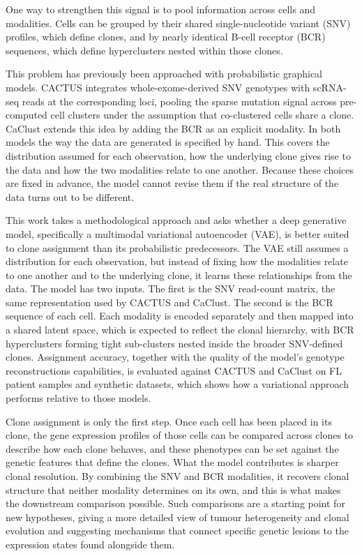 One way to strengthen this signal is to pool information across cells and modalities.
Cells can be grouped by their shared single-nucleotide variant (SNV) profiles, which define clones, and by nearly identical B-cell receptor (BCR) sequences, which define hyperclusters nested within those clones.

This problem has previously been approached with probabilistic graphical models.
CACTUS integrates whole-exome-derived SNV genotypes with scRNA-seq reads at the corresponding loci, pooling the sparse mutation signal across pre-computed cell clusters under the assumption that co-clustered cells share a clone.
CaClust extends this idea by adding the BCR as an explicit modality.
In both models the way the data are generated is specified by hand.
This covers the distribution assumed for each observation, how the underlying clone gives rise to the data and how the two modalities relate to one another.
Because these choices are fixed in advance, the model cannot revise them if the real structure of the data turns out to be different.

This work takes a methodological approach and asks whether a deep generative model, specifically a multimodal variational autoencoder (VAE), is better suited to clone assignment than its probabilistic predecessors.
The VAE still assumes a distribution for each observation, but instead of fixing how the modalities relate to one another and to the underlying clone, it learns these relationships from the data.
The model has two inputs.
The first is the SNV read-count matrix, the same representation used by CACTUS and CaClust.
The second is the BCR sequence of each cell.
Each modality is encoded separately and then mapped into a shared latent space, which is expected to reflect the clonal hierarchy, with BCR hyperclusters forming tight sub-clusters nested inside the broader SNV-defined clones.
Assignment accuracy, together with the quality of the model's genotype reconstructions capabilities, is evaluated against CACTUS and CaClust on FL patient samples and synthetic datasets, which shows how a variational approach performs relative to those models.

Clone assignment is only the first step. Once each cell has been placed in its clone, the gene expression profiles of those cells can be compared across clones to describe how each clone behaves, and these phenotypes can be set against the genetic features that define the clones.
What the model contributes is sharper clonal resolution. By combining the SNV and BCR modalities, it recovers clonal structure that neither modality determines on its own, and this is what makes the downstream comparison possible.
Such comparisons are a starting point for new hypotheses, giving a more detailed view of tumour heterogeneity and clonal evolution and suggesting mechanisms that connect specific genetic lesions to the expression states found alongside them.